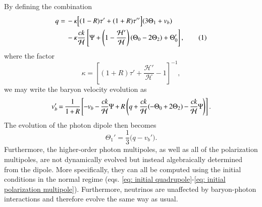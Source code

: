 \documentclass{aa}
\newcommand\numberthis{\addtocounter{equation}{1}\tag{\theequation}}
\numberwithin{equation}{section}
\numberwithin{table}{section}
\numberwithin{figure}{section}
\begin{document}
By defining the combination
\begin{align*}
q =\, &-\kappa\Big[(1 - R)\tau' + (1 + R)\tau''\Big](3\Theta_1 + v_b) \\
&-\kappa\frac{ck}{\mathcal{H}}\left[\Psi + \left(1 - \frac{\mathcal{H}'}{\mathcal{H}}\right)(\Theta_0 - 2\Theta_2) + \Theta_0'\right], \numberthis
\end{align*}
where the factor
\begin{equation}
  \kappa = \left[(1+R)\tau' + \frac{\mathcal{H'}}{\mathcal{H}}-1\right]^{-1},
\end{equation}
we may write the baryon velocity evolution as
\begin{equation}
v_b' \hspace{-1pt}=\hspace{-1pt} \frac{1}{1 \hspace{-0.7pt}+\hspace{-0.7pt} R} \hspace{-0.5pt}\left[ \hspace{-0.5pt}-\hspace{-0.5pt}v_b \hspace{-0.5pt}- \hspace{-0.5pt}\frac{ck}{\mathcal{H}} \hspace{-0.5pt}\Psi \hspace{-0.5pt}+\hspace{-0.5pt} R \left( q \hspace{-0.5pt}+ \hspace{-0.5pt}\frac{ck}{\mathcal{H}}(\hspace{-0.5pt}-\Theta_0 \hspace{-0.5pt}+\hspace{-0.5pt} 2\Theta_2) \hspace{-0.5pt}-\hspace{-0.5pt} \frac{ck}{\mathcal{H}}\hspace{-0.5pt} \Psi \hspace{-0.5pt}\right) \right].
\end{equation}
The evolution of the photon dipole then becomes
\begin{equation}
\Theta_1' = \frac{1}{3} \big(q - v_b'\big).
\end{equation}
Furthermore, the higher-order photon multipoles, as well as all of the polarization multipoles, are not dynamically evolved but instead algebraically determined from the dipole. More specifically, they can all be computed using the initial conditions in the normal regime (eqs. \eqref{eq: initial quadrupole}-\eqref{eq: initial polarization multipole}). Furthermore, neutrinos are unaffected by baryon-photon interactions and therefore evolve the same way as usual. 
\end{document}
